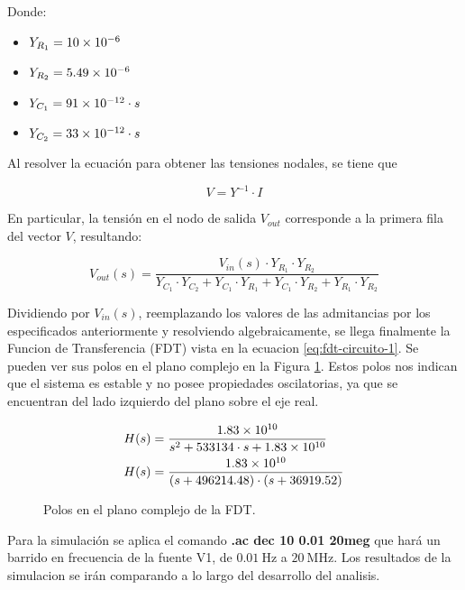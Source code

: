 Donde:
\begin{itemize}
  \item $Y_{R_1} = \num{10d-6}$
  \item $Y_{R_2} = \num{5.49d-6}$
  \item $Y_{C_1} = \num{91d-12} \cdot s$
  \item $Y_{C_2} = \num{33d-12} \cdot s$
\end{itemize}

Al resolver la ecuación para obtener las tensiones nodales, se tiene que

\begin{equation}
V = Y^{-1} \cdot I
\end{equation}

En particular, la tensión en el nodo de salida \(V_{out}\) corresponde a la primera fila del vector \(V\), resultando:

$$
  V_{out}(s) = \frac{V_{in}(s) \cdot Y_{R_1} \cdot Y_{R_2}}{Y_{C_1} \cdot Y_{C_2} + Y_{C_1} \cdot Y_{R_1} + Y_{C_1} \cdot Y_{R_2} + Y_{R_1} \cdot Y_{R_2}}
$$

Dividiendo por $V_{in}(s)$, reemplazando los valores de las admitancias por los especificados anteriormente y
resolviendo algebraicamente, se llega finalmente la Funcion de Transferencia (FDT) vista en la ecuacion \ref{eq:fdt-circuito-1}.
Se pueden ver sus polos en el plano complejo en la Figura \ref{fig:polos_circuito_1}. Estos polos nos indican que el
sistema es estable y no posee propiedades oscilatorias, ya que se encuentran del lado izquierdo del plano sobre el eje
real.

\begin{align}
  \label{eq:fdt-circuito-1}
  H(s) &= \frac{\num{1.83d10}}{s^2 + 533134 \cdot s + \num{1.83d10}}\\
  H(s) &= \frac{\num{1.83d10}}{(s + 496214.48)\cdot(s + 36919.52)}
  \label{eq:fdt-circuito-1-simplify}
\end{align}


\begin{figure}[H]
  \centering
  
  \caption{Polos en el plano complejo de la FDT.}
  \label{fig:polos_circuito_1}
\end{figure}

Para la simulación se aplica el comando \textbf{.ac dec 10 0.01 20meg} que hará un barrido en frecuencia de la fuente V1, de $0.01\ \si{\hertz}$ a 
$20\ \si{\mega\hertz}$. Los resultados de la simulacion se irán comparando a lo largo del desarrollo del analisis.\\


